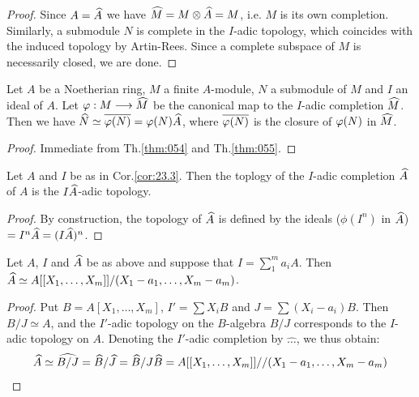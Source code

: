 \documentclass[../main]{subfiles}
\begin{document}
\begin{proof}
Since $A = \widehat{A}$ we have $\widehat{M} = M \otimes \widehat{A} = M$, i.e. $M$ is its own completion. Similarly, a submodule $N$ is complete in the $I$-adic topology, which coincides with the induced topology by Artin-Rees. Since a complete subspace of $M$ is necessarily closed, we are done.
\end{proof}

\begin{corollary}
\label{cor:23.3}
Let $A$ be a Noetherian ring, $M$ a finite $A$-module, $N$ a submodule of $M$ and $I$ an ideal of $A$. Let $\varphi : M \longrightarrow \widehat{M}$ be the canonical map to the $I$-adic completion $\widehat{M}$. Then we have $\widehat{N} \simeq \overline {\varphi(N)} = \varphi(N)\widehat{A}$, where $\overline {\varphi(N)}$ is the closure of $\varphi(N)$ in $\widehat{M}$. 
\end{corollary}

\begin{proof}
Immediate from Th.\ref{thm:054} and Th.\ref{thm:055}. 
\end{proof}

\begin{corollary}
Let $A$ and $I$ be as in Cor.\ref{cor:23.3}. Then the toplogy of the $I$-adic completion $\widehat{A}$ of $A$ is the $I \widehat{A}$-adic topology. 
\end{corollary}

\begin{proof}
By construction, the topology of $\widehat{A}$ is defined by the ideals ($\phi(I^n)$ in $\widehat{A}$) $= I^n \widehat{A} = (I \widehat{A})^n$.
\end{proof}

\begin{corollary}
Let $A$, $I$ and $\widehat{A}$ be as above and suppose that $I = \sum\limits_1^m a_i A$. Then $\widehat{A} \simeq A[[X_1, \dots, X_m]]/(X_1 - a_1, \dots, X_m - a_m)$.
\end{corollary}

\begin{proof}
Put $B = A[X_1, \ldots, X_m]$, $I' = \sum X_i B$ and $J = \sum (X_i - a_i)B$. Then $B/J \simeq A$, and the $I'$-adic topology on the $B$-algebra $B/J$ corresponds to the $I$-adic topology on $A$. Denoting the $I'$-adic completion by $\widehat {\ldots}$, we thus obtain: 
\[
\widehat{A} \simeq \widehat {B/J} = \widehat B/\widehat J = \widehat B/J \widehat B = A[[X_1, \dots, X_m]]//(X_1 - a_1, \dots, X_m - a_m)
\]
\end{proof}
\end{document}
